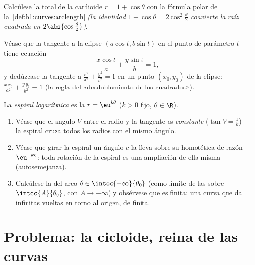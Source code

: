 \begin{exercise}[$\star\star$]\label{exo:b1:curves:10}
Calcúlese la  total de la cardioide $r = 1 + \cos\theta$
con la fórmula polar de la~\cref{def:b1:curves:arclength} \emph{(la
identidad $1 + \cos\theta = 2\cos^2\frac\theta2$ convierte la raíz
cuadrada en $2\abs{\cos\frac\theta2}$)}.
\end{exercise}

\begin{exercise}[$\star\star$]\label{exo:b1:curves:11}
Véase que la tangente a la elipse $(a\cos t, b\sin t)$ en el punto de
parámetro $t$ tiene ecuación
\[
\frac{x\cos t}{a} + \frac{y\sin t}{b} = 1 ,
\]
y dedúzcase la tangente a $\frac{x^2}{a^2} + \frac{y^2}{b^2} = 1$ en
un punto $(x_0, y_0)$ de la elipse:
$\frac{x\,x_0}{a^2} + \frac{y\,y_0}{b^2} = 1$ (la regla del
«desdoblamiento de los cuadrados»).
\end{exercise}

\begin{exercise}[$\star\star\star$]\label{exo:b1:curves:12}
La \emph{espiral logarítmica} es la 
$r = \eu^{k\theta}$ ($k > 0$ fijo, $\theta \in \R$).
\begin{enumerate}
  \item Véase que el ángulo $V$ entre el radio y la tangente es
        \emph{constante} ($\tan V = \frac1k$) --- la espiral cruza
        todos los radios con el mismo ángulo.
  \item Véase que girar la espiral un ángulo $c$ la lleva sobre su
        homotética de razón $\eu^{-kc}$: toda rotación de la espiral
        es una ampliación de ella misma (autosemejanza).
  \item Calcúlese la  del arco
        $\theta \in \intoc{-\infty}{\theta_0}$ (como límite de las
         sobre $\intcc{A}{\theta_0}$, con
        $A \to -\infty$) y obsérvese que es finita: una curva que da
        infinitas vueltas en torno al origen, de  finita.
\end{enumerate}
\end{exercise}

\section{Problema: la cicloide, reina de las curvas}

